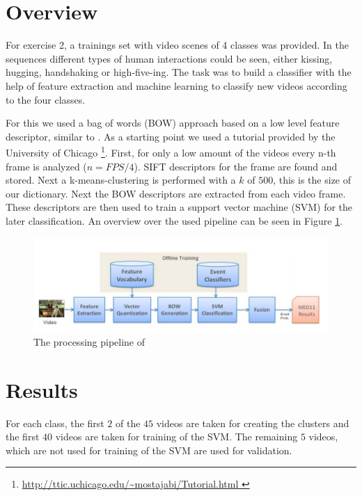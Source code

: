 \documentclass[]{scrartcl}
\begin{document}
\maketitle

\section{Overview}
For exercise 2, a trainings set with video scenes of 4 classes was provided. 
In the sequences different types of human interactions could be seen, either kissing, hugging, handshaking or high-five-ing. 
The task was to build a classifier with the help of feature extraction and machine learning to classify new videos according to the four classes.

For this we used a bag of words (BOW) \cite{csurka2004visual} approach based on a low level feature descriptor, similar to \cite{tamrakar2012evaluation}. As a starting point we used a tutorial provided by the University of Chicago \footnote{\url{http://ttic.uchicago.edu/~mostajabi/Tutorial.html }}.
First, for only a low amount of the videos every n-th frame is analyzed ($n = FPS/4$). 
SIFT \cite{lowe2004distinctive} descriptors for the frame are found and stored. 
Next a k-means-clustering is performed with a $k$ of $500$, this is the size of our dictionary. 
Next the BOW descriptors are extracted from each video frame. 
These descriptors are then used to train a support vector machine (SVM) for the later classification.
An overview over the used pipeline can be seen in Figure \ref{fig:grafik}.
\begin{figure}[h]
	\centering
	\includegraphics[width = \textwidth]{papergrafik.png}
	\caption{The processing pipeline of \cite{tamrakar2012evaluation}}
	\label{fig:grafik}
\end{figure}

\section{Results}

For each class, the first $2$ of the $45$ videos are taken for creating the clusters and the first $40$ videos are taken for training of the SVM.
The remaining $5$ videos, which are not used for training of the SVM are used for validation.
\end{document}
